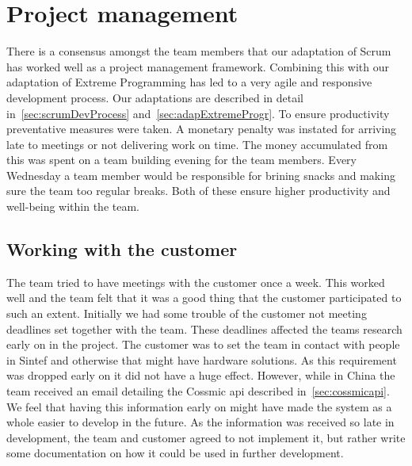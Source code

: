 \section{Project management}
There is a consensus amongst the team members that our adaptation of Scrum has worked well as a project management framework. Combining this with our adaptation of Extreme Programming has led to a very agile and responsive development process. Our adaptations are described in detail in~\ref{sec:scrumDevProcess} and~\ref{sec:adapExtremeProgr}. To ensure productivity preventative measures were taken. A monetary penalty was instated for arriving late to meetings or not delivering work on time. The money accumulated from this was spent on a team building evening for the team members. Every Wednesday a team member would be responsible for brining snacks and making sure the team too regular breaks. Both of these ensure higher productivity and well-being within the team.

\subsection{Working with the customer}
The team tried to have meetings with the customer once a week. This worked well and the team felt that it was a good thing that the customer participated to such an extent. Initially we had some trouble of the customer not meeting deadlines set together with the team. These deadlines affected the teams research early on in the project. The customer was to set the team in contact with people in Sintef and otherwise that might have hardware solutions. As this requirement was dropped early on it did not have a huge effect. However, while in China the team received an email detailing the Cossmic api described in~\ref{sec:cossmicapi}. We feel that having this information early on might have made the system as a whole easier to develop in the future. As the information was received so late in development, the team and customer agreed to not implement it, but rather write some documentation on how it could be used in further development.

